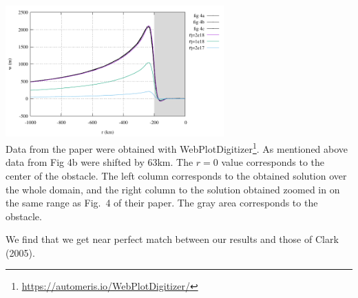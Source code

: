 \begin{center}
\includegraphics[width=8.4cm]{python_codes/fieldstone_108/results/w_eta_zoom.pdf}\\
{\captionfont Data from the paper were obtained with WebPlotDigitizer\footnote{\url{https://automeris.io/WebPlotDigitizer/}}. 
As mentioned above data from Fig 4b were shifted by 63km. The $r=0$ value corresponds to the center of the obstacle. The left 
column corresponds to the obtained solution over the whole domain, and the right column to the solution obtained zoomed in 
on the same range as Fig.~4 of their paper. The gray area corresponds to the obstacle.}
\end{center}

We find that we get near perfect match between our results and those of Clark \etal (2005). 


